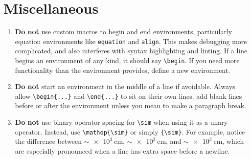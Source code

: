 \documentclass[
    prd, superscriptaddress, nofootinbib, amsmath, amssymb,
    aps, floatfix, preprintnumbers
]{revtex4-2}
\begin{document}
\section{Miscellaneous}
\begin{enumerate}
\item \textbf{Do not} use custom macros to begin and end environments, particularly equation environments like \texttt{equation} and \texttt{align}. This makes debugging more complicated, and also interferes with syntax highlighting and linting. If a line begins an environment of any kind, it should say \verb|\begin|. If you need more functionality than the environment provides, define a new environment.
\item \textbf{Do not} start an environment in the middle of a line if avoidable. Always allow \verb|\begin{...}| and \verb|\end{...}| to sit on their own lines.  add blank lines before or after the environment unless you mean to make a paragraph break.
\item \textbf{Do not} use binary operator spacing for \verb|\sim| when using it as a unary operator. Instead, use \verb|\mathop{\sim}| or simply \verb|{\sim}|. For example, notice the difference between $\sim\qty{e3}{\centi\meter}$, $\mathop{\sim}\qty{e3}{\centi\meter}$, and ${\sim}\qty{e3}{\centi\meter}$, which are especially pronounced when a line has extra space before a newline.
\end{enumerate}


\end{document}
